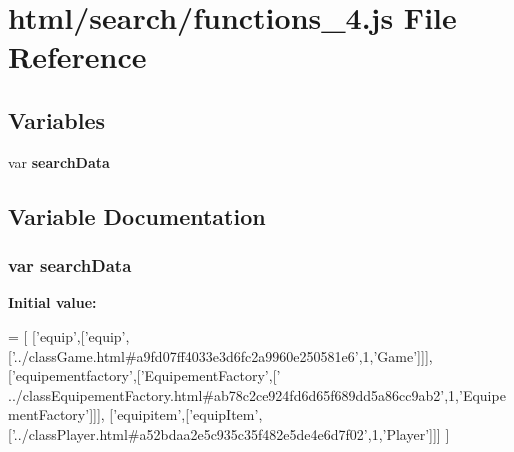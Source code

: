 \section{html/search/functions\-\_\-4.js File Reference}
\label{functions__4_8js}
\subsection*{Variables}
\begin{DoxyCompactItemize}
\item 
var {\bf search\-Data}
\end{DoxyCompactItemize}


\subsection{Variable Documentation}
\subsubsection[{search\-Data}]{\setlength{\rightskip}{0pt plus 5cm}var search\-Data}\label{functions__4_8js_ad01a7523f103d6242ef9b0451861231e}
{\bfseries Initial value\-:}
\begin{DoxyCode}
=
[
  [\textcolor{stringliteral}{'equip'},[\textcolor{stringliteral}{'equip'},[\textcolor{stringliteral}{'../classGame.html#a9fd07ff4033e3d6fc2a9960e250581e6'},1,\textcolor{stringliteral}{'Game'}]]],
  [\textcolor{stringliteral}{'equipementfactory'},[\textcolor{stringliteral}{'EquipementFactory'},[\textcolor{stringliteral}{'
      ../classEquipementFactory.html#ab78c2ce924fd6d65f689dd5a86cc9ab2'},1,\textcolor{stringliteral}{'EquipementFactory'}]]],
  [\textcolor{stringliteral}{'equipitem'},[\textcolor{stringliteral}{'equipItem'},[\textcolor{stringliteral}{'../classPlayer.html#a52bdaa2e5c935c35f482e5de4e6d7f02'},1,\textcolor{stringliteral}{'Player'}]]]
]
\end{DoxyCode}
